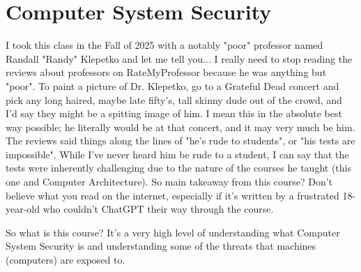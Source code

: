 \chapter{Computer System Security}
I took this class in the Fall of 2025 with a notably "poor" professor named
Randall "Randy" Klepetko and let me tell you... I really need to stop reading the reviews
about professors on RateMyProfessor because he was anything but "poor". To paint a picture
of Dr. Klepetko, go to a Grateful Dead concert and pick any long haired, maybe late fifty's,
tall skinny dude out of the crowd, and I'd say they might be a spitting image of him. I mean
this in the absolute best way possible; he literally would be at that concert, and it may
very much be him. The reviews said things along the lines of "he's rude to students", or
"his tests are impossible". While I've never heard him be rude to a student, I can say that
the tests were inherently challenging due to the nature of the courses he taught (this one and
Computer Architecture). So main takeaway from this course? Don't believe what you read on the
internet, especially if it's written by a frustrated 18-year-old who couldn't ChatGPT their
way through the course.

So what is this course? It's a very high level of understanding what Computer System Security
is and understanding some of the threats that machines (computers) are exposed to.